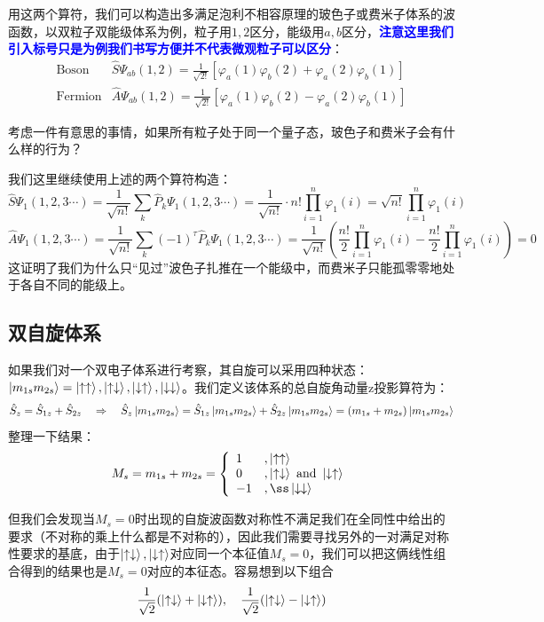 用这两个算符，我们可以构造出多满足泡利不相容原理的玻色子或费米子体系的波函数，以双粒子双能级体系为例，粒子用$1,2$区分，能级用$a,b$区分，\textcolor{blue}{\textbf{注意这里我们引入标号只是为例我们书写方便并不代表微观粒子可以区分}}：
\[\begin{array}{ll}
\text{Boson} & \hat{S}\varPsi_{ab}(1,2)=\frac{1}{\sqrt{2!}}[\varphi_a(1)\varphi_b(2)+\varphi_a(2)\varphi_b(1)]\\
\text{Fermion} & \hat{A}\varPsi_{ab}(1,2)=\frac{1}{\sqrt{2!}}[\varphi_a(1)\varphi_b(2)-\varphi_a(2)\varphi_b(1)] 
\end{array}\]

考虑一件有意思的事情，如果所有粒子处于同一个量子态，玻色子和费米子会有什么样的行为？

我们这里继续使用上述的两个算符构造：
\[\hat{S}\varPsi_{1}(1,2,3 \cdots)=\frac{1}{\sqrt{n!}}\sum_{k}\hat{P}_{k}\varPsi_{1}(1,2,3 \cdots)=\frac{1}{\sqrt{n!}}\cdot n!\prod_{i=1}^n\varphi_1(i)=\sqrt{n!}\prod_{i=1}^n\varphi_1(i)\]
\[\hat{A}\varPsi_{1}(1,2,3 \cdots)=\frac{1}{\sqrt{n!}}\sum_{k}(-1)^{\tau}\hat{P}_{k}\varPsi_{1}(1,2,3 \cdots)=\frac{1}{\sqrt{n!}}\left (\frac{n!}{2}\prod_{i=1}^n\varphi_1(i)-\frac{n!}{2}\prod_{i=1}^n\varphi_1(i) \right )=0\]
这证明了我们为什么只“见过”波色子扎推在一个能级中，而费米子只能孤零零地处于各自不同的能级上。

\subsection{双自旋体系}
如果我们对一个双电子体系进行考察，其自旋可以采用四种状态：$\ket{m_{1s}m_{2s}}=\ket{\uparrow\uparrow},\ket{\uparrow\downarrow},\ket{\downarrow\uparrow},\ket{\downarrow\downarrow}$。我们定义该体系的总自旋角动量z投影算符为：
\[\hat{S}_z=\hat{S}_{1z}+\hat{S}_{2z} \quad \Rightarrow \quad \hat{S}_z\ket{m_{1s}m_{2s}}=\hat{S}_{1z}\ket{m_{1s}m_{2s}}+\hat{S}_{2z}\ket{m_{1s}m_{2s}}=(m_{1s}+m_{2s})\ket{m_{1s}m_{2s}}\]
整理一下结果：
\[M_s=m_{1s}+m_{2s}=\left\{
\begin{array}{ll}
1  & ,\ket{\uparrow\uparrow}\\
0  & ,\ket{\uparrow\downarrow}\text{ and }\ket{\downarrow\uparrow}\\
-1 & ,ß\ket{\downarrow\downarrow}
\end{array}
\right.\]

但我们会发现当$M_s=0$时出现的自旋波函数对称性不满足我们在全同性中给出的要求（不对称的乘上什么都是不对称的），因此我们需要寻找另外的一对满足对称性要求的基底，由于$\ket{\uparrow\downarrow},\ket{\downarrow\uparrow}$对应同一个本征值$M_s=0$，我们可以把这俩线性组合得到的结果也是$M_s=0$对应的本征态。容易想到以下组合
\[\frac{1}{\sqrt{2}}(\ket{\uparrow\downarrow}+\ket{\downarrow\uparrow}), \quad \frac{1}{\sqrt{2}}(\ket{\uparrow\downarrow}-\ket{\downarrow\uparrow})\]

